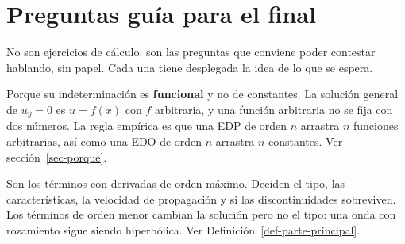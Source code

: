\documentclass[
  spanish,
  a4paper,
]{scrbook}
\theoremstyle{definition}
\theoremstyle{plain}
\theoremstyle{definition}
\theoremstyle{plain}
\theoremstyle{definition}
\theoremstyle{remark}
\begin{document}
\section{Preguntas guía para el final}\label{sec-preguntas}

No son ejercicios de cálculo: son las preguntas que conviene poder
contestar hablando, sin papel. Cada una tiene desplegada la idea de lo
que se espera.

\begin{tcolorbox}[enhanced jigsaw, arc=.35mm, bottomrule=.15mm, bottomtitle=1mm, breakable, colback=white, colbacktitle=quarto-callout-tip-color!10!white, colframe=quarto-callout-tip-color-frame, coltitle=black, left=2mm, leftrule=.75mm, opacityback=0, opacitybacktitle=0.6, rightrule=.15mm, title=\textcolor{quarto-callout-tip-color}{\faLightbulb}\hspace{0.5em}{1. ¿Por qué una EDP necesita datos sobre curvas y no en puntos aislados?}, titlerule=0mm, toprule=.15mm, toptitle=1mm]

Porque su indeterminación es \textbf{funcional} y no de constantes. La
solución general de \(u_y = 0\) es \(u = f(x)\) con \(f\) arbitraria, y
una función arbitraria no se fija con dos números. La regla empírica es
que una EDP de orden \(n\) arrastra \(n\) funciones arbitrarias, así
como una EDO de orden \(n\) arrastra \(n\) constantes. Ver
sección~\ref{sec-porque}.

\end{tcolorbox}

\begin{tcolorbox}[enhanced jigsaw, arc=.35mm, bottomrule=.15mm, bottomtitle=1mm, breakable, colback=white, colbacktitle=quarto-callout-tip-color!10!white, colframe=quarto-callout-tip-color-frame, coltitle=black, left=2mm, leftrule=.75mm, opacityback=0, opacitybacktitle=0.6, rightrule=.15mm, title=\textcolor{quarto-callout-tip-color}{\faLightbulb}\hspace{0.5em}{2. ¿Qué es la parte principal y por qué se lleva toda la atención?}, titlerule=0mm, toprule=.15mm, toptitle=1mm]

Son los términos con derivadas de orden máximo. Deciden el tipo, las
características, la velocidad de propagación y si las discontinuidades
sobreviven. Los términos de orden menor cambian la solución pero no el
tipo: una onda con rozamiento sigue siendo hiperbólica. Ver
Definición~\ref{def-parte-principal}.

\end{tcolorbox}
\end{document}
